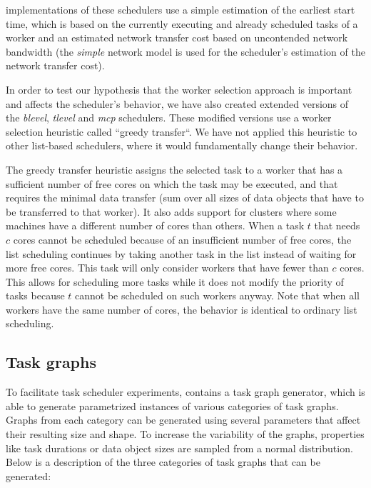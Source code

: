 \estee{} implementations of these schedulers use a simple estimation of the earliest
start time, which is based on the currently executing and already scheduled tasks of a worker and
an estimated network transfer cost based on uncontended network bandwidth (the
\emph{simple} network model is used for the scheduler's estimation of the network
transfer cost).

In order to test our hypothesis that the worker selection approach is important and affects the
scheduler's behavior, we have also created extended versions of the \emph{blevel},
\emph{tlevel} and \emph{mcp} schedulers. These modified versions use a
worker selection heuristic called ``greedy transfer``. We have not applied this heuristic to other
list-based schedulers, where it would fundamentally change their behavior.

The greedy transfer heuristic assigns the selected task to a worker that has a sufficient number of
free cores on which the task may be executed, and that requires the minimal data transfer (sum over
all sizes of data objects that have to be transferred to that worker). It also adds support for
clusters where some machines have a different number of cores than others. When a task
$t$ that needs $c$ cores cannot be scheduled because of an
insufficient number of free cores, the list scheduling continues by taking another task in the list
instead of waiting for more free cores. This task will only consider workers that have fewer than
$c$ cores. This allows for scheduling more tasks while it does not modify the
priority of tasks because $t$ cannot be scheduled on such workers anyway. Note
that when all workers have the same number of cores, the behavior is identical to ordinary list
scheduling.

\subsection{Task graphs}
To facilitate task scheduler experiments, \estee{} contains a task graph generator,
which is able to generate parametrized instances of various categories of task graphs. Graphs from
each category can be generated using several parameters that affect their resulting size and shape.
To increase the variability of the graphs, properties like task durations or data object sizes are
sampled from a normal distribution. Below is a description of the three categories of task graphs
that can be generated:

